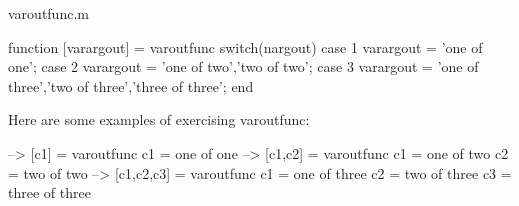 \begin{DoxyVerb}     varoutfunc.m
\end{DoxyVerb}



\begin{DoxyVerbInclude}
function [varargout] = varoutfunc
  switch(nargout)
    case 1
      varargout = {'one of one'};
    case 2
      varargout = {'one of two','two of two'};
    case 3
      varargout = {'one of three','two of three','three of three'};
  end
\end{DoxyVerbInclude}


Here are some examples of exercising {\ttfamily varoutfunc}\-:


\begin{DoxyVerbInclude}
--> [c1] = varoutfunc
c1 = 
one of one
--> [c1,c2] = varoutfunc
c1 = 
one of two
c2 = 
two of two
--> [c1,c2,c3] = varoutfunc
c1 = 
one of three
c2 = 
two of three
c3 = 
three of three
\end{DoxyVerbInclude}
 